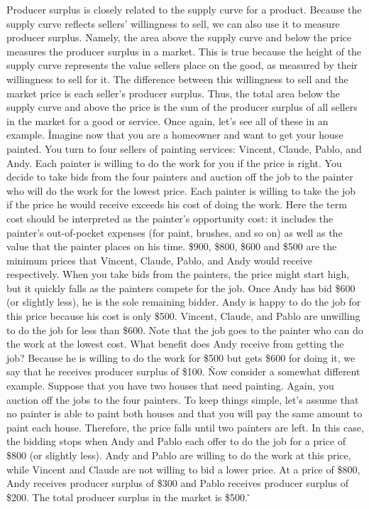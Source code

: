 Producer surplus is closely related to the supply curve for a product. Because the supply curve reflects sellers'
willingness to sell, we can also use it to measure producer surplus. Namely, the area above the supply curve and
below the price measures the producer surplus in a market. This is true because the height of the supply curve
represents the value sellers place on the good, as measured by their willingness to sell for it. The difference
between this willingness to sell and the market price is each seller's producer surplus. Thus, the total area below
the supply curve and above the price is the sum of the producer surplus of all sellers in the market for a good or
service. Once again, let's see all of these in an example. \v

Imagine now that you are a homeowner and want to get your house painted. You turn to four sellers of painting
services: Vincent, Claude, Pablo, and Andy. Each painter is willing to do the work for you if the price is right. You
decide to take bids from the four painters and auction off the job to the painter who will do the work for the lowest
price. Each painter is willing to take the job if the price he would receive exceeds his cost of doing the work. Here
the term cost should be interpreted as the painter's opportunity cost: it includes the painter's out-of-pocket
expenses (for paint, brushes, and so on) as well as the value that the painter places on his time. \$900, \$800,
\$600 and \$500 are the minimum prices that Vincent, Claude, Pablo, and Andy would receive respectively. When you
take bids from the painters, the price might start high, but it quickly falls as the painters compete for the job.
Once Andy has bid \$600 (or slightly less), he is the sole remaining bidder. Andy is happy to do the job for this
price because his cost is only \$500. Vincent, Claude, and Pablo are unwilling to do the job for less than \$600.
Note that the job goes to the painter who can do the work at the lowest cost. What benefit does Andy receive from
getting the job? Because he is willing to do the work for \$500 but gets \$600 for doing it, we say that he receives
producer surplus of \$100. \v

Now consider a somewhat different example. Suppose that you have two houses that need painting. Again, you auction
off the jobs to the four painters. To keep things simple, let's assume that no painter is able to paint both houses
and that you will pay the same amount to paint each house. Therefore, the price falls until two painters are left. In
this case, the bidding stops when Andy and Pablo each offer to do the job for a price of \$800 (or slightly less).
Andy and Pablo are willing to do the work at this price, while Vincent and Claude are not willing to bid a lower
price. At a price of \$800, Andy receives producer surplus of \$300 and Pablo receives producer surplus of \$200. The
total producer surplus in the market is \$500. \v

